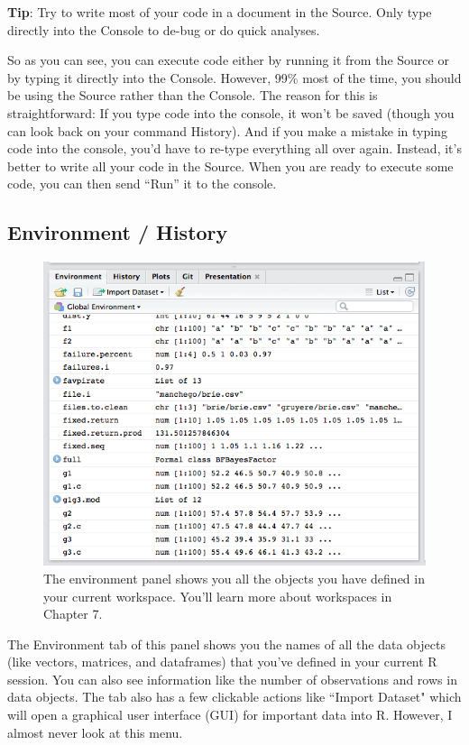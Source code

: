 \documentclass[
]{book}
\begin{document}
\textbf{Tip}: Try to write most of your code in a document in the Source. Only type directly into the Console to de-bug or do quick analyses.

So as you can see, you can execute code either by running it from the Source or by typing it directly into the Console. However, 99\% most of the time, you should be using the Source rather than the Console. The reason for this is straightforward: If you type code into the console, it won't be saved (though you can look back on your command History). And if you make a mistake in typing code into the console, you'd have to re-type everything all over again. Instead, it's better to write all your code in the Source. When you are ready to execute some code, you can then send ``Run'' it to the console.

\hypertarget{environment-history}{%
\subsection{Environment / History}\label{environment-history}}

\begin{figure}
\includegraphics[width=0.75\linewidth]{images/environmentss} \caption{The environment panel shows you all the objects you have defined in your current workspace. You'll learn more about workspaces in Chapter 7.}\label{fig:environwindow}
\end{figure}

The Environment tab of this panel shows you the names of all the data objects (like vectors, matrices, and dataframes) that you've defined in your current R session. You can also see information like the number of observations and rows in data objects. The tab also has a few clickable actions like ``Import Dataset" which will open a graphical user interface (GUI) for important data into R. However, I almost never look at this menu.
\end{document}
